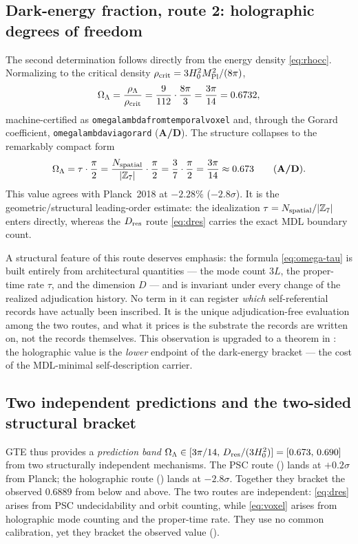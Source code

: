 \documentclass[11pt]{article}
\theoremstyle{remark}
\newcommand{\ZS}{\mathbb{Z}_7}
\newcommand{\lean}[1]{%
  \penalty-100
  \begingroup\def\_{\textunderscore\allowbreak}\texttt{#1}\endgroup}
\newcommand{\MPl}{M_{\rm Pl}}
\newcommand{\Hnought}{H_0}
\newcommand{\OmL}{\Omega_\Lambda}
\newcommand{\rhoc}{\rho_{\rm crit}}
\newcommand{\Dres}{D_{\rm res}}
\newcommand{\CatAD}{\textbf{A/D}}
\begin{document}
\subsection{Dark-energy fraction, route 2: holographic degrees of freedom}
\label{sec:cc-voxel}

The second determination follows directly from the energy density
\eqref{eq:rhocc}. Normalizing to the critical density
$\rhoc = 3\Hnought^2\MPl^2/(8\pi)$,
\begin{equation}
  \OmL = \frac{\rho_\Lambda}{\rhoc}
  = \frac{9}{112}\cdot\frac{8\pi}{3}
  = \frac{3\pi}{14} = 0.6732,
  \label{eq:voxel}
\end{equation}
machine-certified as \lean{omega\_lambda\_from\_temporal\_voxel} and, through the
Gorard coefficient, \lean{omega\_lambda\_via\_gorard} (\CatAD). The structure
collapses to the remarkably compact form
\begin{equation}
  \OmL = \tau\cdot\frac{\pi}{2}
       = \frac{N_{\rm spatial}}{|\ZS|}\cdot\frac{\pi}{2}
       = \frac{3}{7}\cdot\frac{\pi}{2}
       = \frac{3\pi}{14} \approx 0.673 \qquad (\CatAD).
  \label{eq:omega-tau}
\end{equation}
This value agrees with Planck~2018 at $-2.28\%$ ($-2.8\sigma$). It is the
geometric/structural leading-order estimate: the idealization $\tau =
N_{\rm spatial}/|\ZS|$ enters directly, whereas the $\Dres$ route
\eqref{eq:dres} carries the exact MDL boundary count.

A structural feature of this route deserves emphasis: the formula
\eqref{eq:omega-tau} is built entirely from architectural quantities --- the
mode count $3L$, the proper-time rate $\tau$, and the dimension $D$ --- and is
invariant under every change of the realized adjudication history. No term in
it can register \emph{which} self-referential records have actually been
inscribed. It is the unique adjudication-free evaluation among the two routes,
and what it prices is the substrate the records are written on, not the records
themselves. This observation is upgraded to a theorem in :
the holographic value is the \emph{lower} endpoint of the dark-energy bracket
--- the cost of the MDL-minimal self-description carrier.

\subsection{Two independent predictions and the two-sided structural bracket}
\label{sec:cc-range}

GTE thus provides a \emph{prediction band} $\OmL \in [3\pi/14,\,\Dres/(3\Hnought^2)] = [0.673,\,0.690]$ from two structurally independent mechanisms. The PSC route () lands at $+0.2\sigma$ from Planck; the holographic route () lands at $-2.8\sigma$. Together they bracket the observed $0.6889$ from below and above. The two routes are independent: \eqref{eq:dres} arises from PSC undecidability and orbit counting, while \eqref{eq:voxel} arises from holographic mode counting and the proper-time rate. They use no common calibration, yet they bracket the observed value ().
\end{document}
